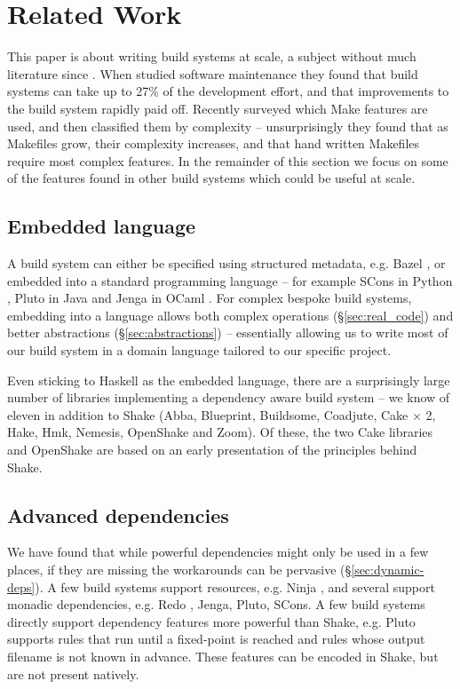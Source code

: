 \section{Related Work\label{section-review}}

This paper is about writing build systems at scale, a subject without much
literature since \citet{miller:recursive_make}. When
\citet{mcintosh:build_maintenance_effort} studied software maintenance they
found that build systems can take up to 27\% of the
development effort, and that improvements to the build system rapidly paid off.
Recently \citet{martin:make_it_simple} surveyed which Make features are used,
and then \citet{martin:maintenance_complexity_makefiles} classified them by
complexity -- unsurprisingly they found that as Makefiles grow, their complexity
increases, and that hand written Makefiles require most complex features. In
the remainder of this section we focus on some of the features found in other
build systems which could be useful at scale.

\subsection{Embedded language}

A build system can either be specified using structured metadata, e.g. Bazel
\cite{bazel}, or embedded into a standard programming language -- for example
SCons in Python \cite{scons}, Pluto in Java \cite{pluto} and Jenga in OCaml
\cite{jenga}. For complex bespoke build systems, embedding into a language
allows both complex operations (\S\ref{sec:real_code}) and better abstractions
(\S\ref{sec:abstractions}) -- essentially allowing us to write most of our build
system in a domain language tailored to our specific project.

Even sticking to Haskell as the embedded language, there are a surprisingly
large number of libraries implementing a dependency aware build system -- we
know of eleven in addition to Shake (Abba, Blueprint, Buildsome, Coadjute, Cake
$\times$ 2, Hake, Hmk, Nemesis, OpenShake and Zoom). Of these, the two Cake
libraries and OpenShake are based on an early presentation of the principles behind Shake.

\subsection{Advanced dependencies}

We have found that while powerful dependencies might only be used in a few
places, if they are missing the workarounds can be pervasive
(\S\ref{sec:dynamic-deps}). A few build systems support resources, e.g.
Ninja \cite{ninja}, and several support monadic dependencies, e.g. Redo
\cite{redo}, Jenga, Pluto, SCons. A few build systems directly support
dependency features more powerful than Shake, e.g. Pluto supports rules
that run until a fixed-point is reached and rules whose output filename is not known in
advance. These features can be encoded in Shake, but are not present natively.

